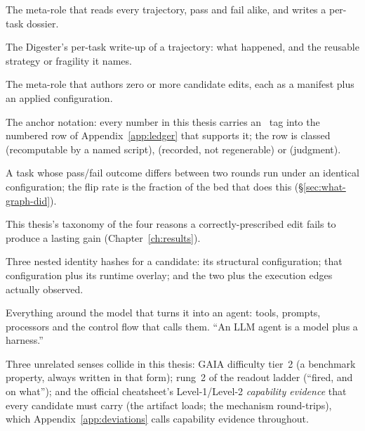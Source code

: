 \begin{description}[leftmargin=1.8em,labelsep=0.4em,itemsep=0.5pt,parsep=0pt,topsep=2pt]
\item[Digester] The meta-role that reads every trajectory, pass and fail
alike, and writes a per-task dossier.

\item[dossier] The Digester's per-task write-up of a trajectory: what
happened, and the reusable strategy or fragility it names.

\item[Evolver] The meta-role that authors zero or more candidate edits,
each as a manifest plus an applied configuration.

\item[\texttt{\textbackslash F\{n\}} / \cls{A}/\cls{B}/\cls{C}] The anchor
notation: every number in this thesis carries an \F{}~tag into the
numbered row of Appendix~\ref{app:ledger} that supports it; the row is
classed  (recomputable by a named script),  (recorded, not
regenerable) or  (judgment).

\item[flip / flip rate] A task whose pass/fail outcome differs between two
rounds run under an identical configuration; the flip rate is the fraction
of the bed that does this (\S\ref{sec:what-graph-did}).

\item[four layers of mortality] This thesis's taxonomy of the four reasons
a correctly-prescribed edit fails to produce a lasting gain
(Chapter~\ref{ch:results}).

\item[genotype / deployment / phenotype] Three nested identity hashes for
a candidate: its structural configuration; that configuration plus its
runtime overlay; and the two plus the execution edges actually observed.

\item[harness] Everything around the model that turns it into an agent:
tools, prompts, processors and the control flow that calls them. ``An LLM
agent is a model plus a harness.''

\item[level 2] Three unrelated senses collide in this thesis: GAIA
difficulty tier~2 (a benchmark property, always written in that form);
rung~2 of the readout ladder (``fired, and on what''); and the official
cheatsheet's Level-1/Level-2 \emph{capability evidence} that every
candidate must carry (the artifact loads; the mechanism round-trips),
which Appendix~\ref{app:deviations} calls capability evidence throughout.


\end{description}
